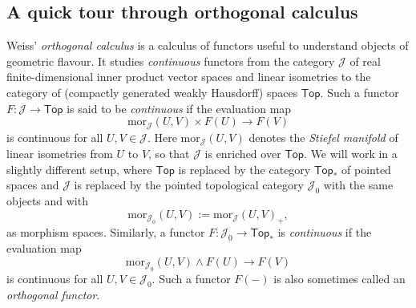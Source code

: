 \documentclass[a4paper, oneside]{amsart}
\newcommand{\1}{\mathds{1}}
\theoremstyle{remark}
\theoremstyle{definition}
\numberwithin{equation}{section}
\begin{document}
\subsection{A quick tour through orthogonal calculus} \label{OrthReviewSection}Weiss' \textit{orthogonal calculus} \cite{WeissOrthCalc} is a calculus of functors useful to understand objects of geometric flavour. It studies \textit{continuous} functors from the category $\mathcal J$ of real finite-dimensional inner product vector spaces and linear isometries to the category of (compactly generated weakly Hausdorff) spaces $\mathsf{Top}$. Such a functor $F: \mathcal J\to \mathsf{Top}$ is said to be \textit{continuous} if the evaluation map
$$
\mathrm{mor}_{\mathcal J}(U,V)\times F(U)\longrightarrow F(V)
$$
is continuous for all $U,V\in\mathcal J$. Here $\mathrm{mor}_{\mathcal J}(U,V)$ denotes the \textit{Stiefel manifold} of linear isometries from $U$ to $V$, so that $\mathcal J$ is enriched over $\mathsf{Top}$. We will work in a slightly different setup, where $\mathsf{Top}$ is replaced by the category $\mathsf{Top}_*$ of pointed spaces and $\mathcal J$ is replaced by the pointed topological category $\mathcal J_0$ with the same objects and with
$$
\mathrm{mor}_{\mathcal J_0}(U,V):=\mathrm{mor}_{\mathcal J}(U,V)_+,
$$
as morphism spaces. Similarly, a functor $F: \mathcal J_0\to \mathsf{Top}_*$ is \textit{continuous} if the evaluation map
$$
\mathrm{mor}_{\mathcal J_0}(U,V)\wedge F(U)\longrightarrow F(V)
$$
is continuous for all $U,V\in \mathcal J_0$. Such a functor $F(-)$ is also sometimes called an \textit{orthogonal functor}.
\end{document}
